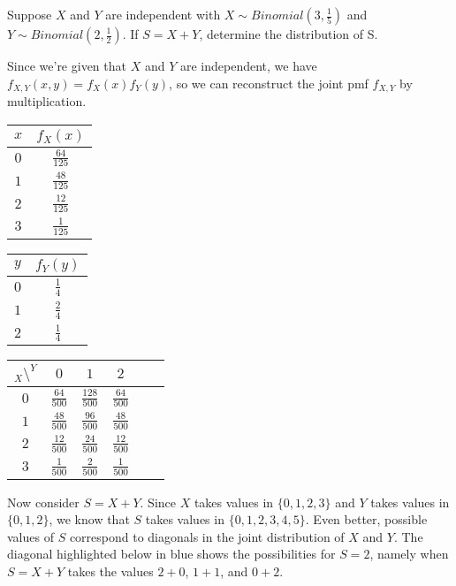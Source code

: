 \begin{examp}\label{sumdistribution}Suppose $X$ and $Y$ are independent with $X \sim Binomial(3,\frac{1}{5})$ and $Y \sim Binomial(2,\frac{1}{2})$. If $S = X + Y$, determine the distribution of S.
\par
\noindent Since we're given that $X$ and $Y$ are independent, we have $f_{X,Y}(x,y)  = f_X(x)f_Y(y)$, so we can reconstruct the joint pmf $f_{X,Y}$ by multiplication.

\begin{center}
\begin{minipage}{0.25\textwidth}
\centering
\renewcommand{\arraystretch}{1.5}
\begin{tabular}{c|c}
$x$ & $f_X(x)$ \\
\hline
$0$ & $\frac{64}{125}$ \\
$1$ & $\frac{48}{125}$ \\
$2$ & $\frac{12}{125}$ \\
$3$ & $\frac{1}{125}$ \\
\end{tabular}
\end{minipage}\begin{minipage}{0.25\textwidth}
\centering
\renewcommand{\arraystretch}{1.5}
\begin{tabular}{c|c}
$y$ & $f_Y(y)$ \\
\hline
$0$ & $\frac{1}{4}$ \\
$1$ & $\frac{2}{4}$ \\
$2$ & $\frac{1}{4}$ \\
\end{tabular}
\end{minipage}\begin{minipage}{0.4\textwidth}
\renewcommand{\arraystretch}{1.5}
\centering
\begin{tabular}{c|ccccc}
$_{X} \setminus ^Y$ & $0$ & $1$ & $2$ \\
\hline
$0$ & $\frac{64}{500}$ & $\frac{128}{500}$ & $\frac{64}{500}$ \\
$1$ & $\frac{48}{500}$ & $\frac{96}{500}$ & $\frac{48}{500}$ \\
$2$ & $\frac{12}{500}$ & $\frac{24}{500}$ & $\frac{12}{500}$ \\
$3$ & $\frac{1}{500}$ & $\frac{2}{500}$ & $\frac{1}{500}$ \\
\end{tabular}
\end{minipage}
\end{center}
Now consider $S = X + Y$. Since $X$ takes values in $\{0,1,2,3\}$ and $Y$ takes values in $\{0,1,2\}$, we know that $S$ takes values in $\{0,1,2,3,4,5\}$. Even better, possible values of $S$ correspond to diagonals in the joint distribution of $X$ and $Y$. The diagonal highlighted below in blue shows the possibilities for $S = 2$, namely when $S = X + Y$ takes the values $2+0$, $1+1$, and $0+2$.

\end{examp}
